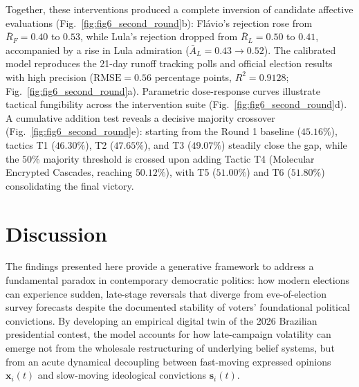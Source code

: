 \documentclass[11pt,a4paper]{article}
\begin{document}
Together, these interventions produced a complete inversion of candidate affective evaluations (Fig.~\ref{fig:fig6_second_round}b): Flávio's rejection rose from $\bar{R}_F = 0.40$ to $0.53$, while Lula's rejection dropped from $\bar{R}_L = 0.50$ to $0.41$, accompanied by a rise in Lula admiration ($\bar{A}_L = 0.43 \to 0.52$). The calibrated model reproduces the 21-day runoff tracking polls and official election results with high precision ($\mathrm{RMSE} = 0.56$ percentage points, $R^2 = 0.9128$; Fig.~\ref{fig:fig6_second_round}a). Parametric dose-response curves illustrate tactical fungibility across the intervention suite (Fig.~\ref{fig:fig6_second_round}d). A cumulative addition test reveals a decisive majority crossover (Fig.~\ref{fig:fig6_second_round}e): starting from the Round 1 baseline ($45.16\%$), tactics T1 ($46.30\%$), T2 ($47.65\%$), and T3 ($49.07\%$) steadily close the gap, while the $50\%$ majority threshold is crossed upon adding Tactic T4 (Molecular Encrypted Cascades, reaching $50.12\%$), with T5 ($51.00\%$) and T6 ($51.80\%$) consolidating the final victory.

\section*{Discussion}

The findings presented here provide a generative framework to address a fundamental paradox in contemporary democratic politics: how modern elections can experience sudden, late-stage reversals that diverge from eve-of-election survey forecasts despite the documented stability of voters' foundational political convictions. By developing an empirical digital twin of the 2026 Brazilian presidential contest, the model accounts for how late-campaign volatility can emerge not from the wholesale restructuring of underlying belief systems, but from an acute dynamical decoupling between fast-moving expressed opinions $\mathbf{x}_i(t)$ and slow-moving ideological convictions $\mathbf{s}_i(t)$.
\end{document}
